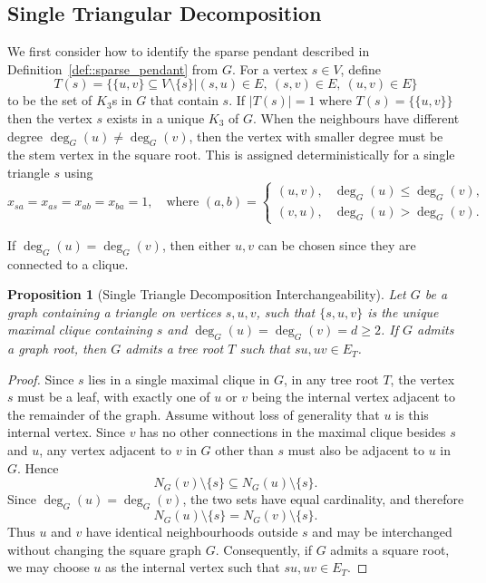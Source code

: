 \documentclass[11pt]{report}
\newtheorem{proposition}{Proposition}
\begin{document}
\subsection{Single Triangular Decomposition} \label{subsec::single_triangular_decomposition}
We first consider how to identify the sparse pendant described in Definition~\ref{def::sparse_pendant} from $G$. For a vertex $s \in V$, define
\[
T(s) = \bigl\{ \{u,v\} \subseteq V \setminus \{s\} \vert (s,u)\in E,\ (s,v)\in E,\ (u,v)\in E \bigr\}
\]
to be the set of $K_3$s in $G$ that contain $s$. If $|T(s)| = 1$ where $T(s) = \{\{u,v\}\}$ then the vertex $s$ exists in a unique $K_3$ of $G$. When the neighbours have different degree $\deg_G(u) \neq \deg_G(v)$, then the vertex with smaller degree must be the stem vertex in the square root. This is assigned deterministically for a single triangle $s$ using
\begin{equation} \label{eq::single_triangle_fix}
  x_{sa} = x_{as} = x_{ab} = x_{ba} = 1, \quad \text{where } (a,b) =
  \begin{cases}
  (u,v), & \deg_G(u) \leq \deg_G(v), \\
  (v,u), & \deg_G(u) > \deg_G(v).
  \end{cases}
\end{equation}

If $\deg_G(u) = \deg_G(v)$, then either $u,v$ can be chosen since they are connected to a clique.

\begin{proposition}[Single Triangle Decomposition Interchangeability] \label{prop::single_triangular_decomposition_equality}
  Let $G$ be a graph containing a triangle on vertices $s,u,v$, such that $\{s,u,v\}$ is the unique maximal clique containing $s$ and $\deg_G(u)=\deg_G(v)=d\geq 2$. If $G$ admits a graph root, then $G$ admits a tree root $T$ such that $su,uv\in E_T$. 
\end{proposition}
\begin{proof}
  Since $s$ lies in a single maximal clique in $G$, in any tree root $T$, the vertex $s$ must be a leaf, with exactly one of $u$ or $v$ being the internal vertex adjacent to the remainder of the graph. Assume without loss of generality that $u$ is this internal vertex. Since $v$ has no other connections in the maximal clique besides $s$ and $u$, any vertex adjacent to $v$ in $G$ other than $s$ must also be adjacent to $u$ in $G$. Hence
  \[
  N_G(v)\setminus\{s\}\subseteq N_G(u)\setminus\{s\}.
  \]
  Since $\deg_G(u)=\deg_G(v)$, the two sets have equal cardinality, and therefore
  \[
  N_G(u)\setminus\{s\}=N_G(v)\setminus\{s\}.
  \]
  Thus $u$ and $v$ have identical neighbourhoods outside $s$ and may be interchanged without changing the square graph $G$. Consequently, if $G$ admits a square root, we may choose $u$ as the internal vertex such that $su,uv \in E_T$.
\end{proof}
\end{document}
